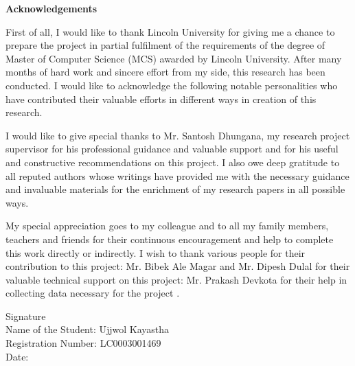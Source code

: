 \pagestyle{plain}
\vspace*{52pt}
\begin{center}
    \large{\textbf{Acknowledgements}}\\[31pt]
\end{center}
First of all, I would like to thank Lincoln University for giving me a chance to prepare the project in partial fulfilment of the requirements of the degree of Master of Computer Science (MCS) awarded by Lincoln University. 
After many months of hard work and sincere effort from my side, this research has been conducted. I would like to acknowledge the following notable personalities who have contributed their valuable efforts in different ways in creation of this research.

\par I would like to give special thanks to Mr. Santosh Dhungana, my research project supervisor for his professional guidance and valuable support and for his useful and constructive recommendations on this project.
I also owe deep gratitude to all reputed authors whose writings have provided me with the necessary guidance and invaluable materials for the enrichment of my research papers in all possible ways. 

\par My special appreciation goes to my colleague and to all my family members, teachers and friends for their continuous encouragement and help to complete this work directly or indirectly.
I wish to thank various people for their contribution to this project: Mr. Bibek Ale Magar and Mr. Dipesh Dulal for their valuable technical support on this project: Mr. Prakash Devkota for their help in collecting data necessary for the project .


\vspace{73pt}

\begin{flushleft}
    Signature \\
    Name of the Student: Ujjwol Kayastha\\
    Registration Number: LC0003001469\\
    Date:
\end{flushleft}


